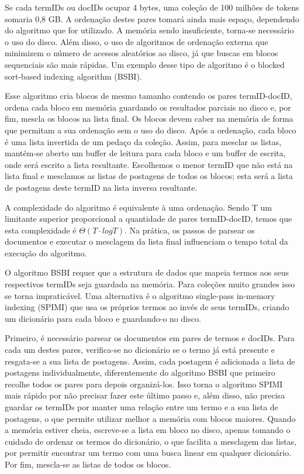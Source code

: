 Se cada termIDs ou docIDs ocupar 4 bytes, uma coleção de 100 milhões de tokens somaria 0,8 GB. A ordenação destes pares tomará ainda mais espaço, dependendo do algoritmo que for utilizado. A memória sendo insuficiente, torna-se necessário o uso do disco. Além disso, o uso de algoritmos de ordenação externa que minimizem o número de acessos aleatórios ao disco, já que buscas em blocos sequenciais são mais rápidas. Um exemplo desse tipo de algoritmo é o blocked sort-based indexing algorithm (BSBI). 

Esse algoritmo cria blocos de mesmo tamanho contendo os pares termID-docID, ordena cada bloco em memória guardando os resultados parciais no disco e, por fim, mescla os blocos na lista final. Os blocos devem caber na memória de forma que permitam a sua ordenação sem o uso do disco. Após a ordenação, cada bloco é uma lista invertida de um pedaço da coleção. Assim, para mesclar as listas, mantém-se aberto um buffer de leitura para cada bloco e um buffer de escrita, onde será escrito a lista resultante. Escolhemos o menor termID que não está na lista final e mesclamos as listas de postagens de todos os blocos; esta será a lista de postagens deste termID na lista inversa resultante. 

A complexidade do algoritmo é equivalente à uma ordenação. Sendo T um limitante superior proporcional a quantidade de pares termID-docID, temos que esta complexidade é $\Theta( T \cdot log T )$. Na prática, os passos de parsear os documentos e executar o mesclagem da lista final influenciam o tempo total da execução do algoritmo.

O algoritmo BSBI requer que a estrutura de dados que mapeia termos aos seus respectivos termIDs seja guardada na memória. Para coleções muito grandes isso se torna impraticável. Uma alternativa é o algoritmo single-pass in-memory indexing (SPIMI) que usa os próprios termos ao invés de seus termIDs, criando um dicionário para cada bloco e guardando-o no disco. 

Primeiro, é necessário parsear os documentos em pares de termos e docIDs. Para cada um destes pares, verifica-se no dicionário se o termo já está presente e resgata-se a sua lista de postagens. Assim, cada postagem é adicionada a lista de postagens individualmente, diferentemente do algoritmo BSBI que primeiro recolhe todos os pares para depois organizá-los. Isso torna o algoritmo SPIMI mais rápido por não precisar fazer este último passo e, além disso, não precisa guardar os termIDs por manter uma relação entre um termo e a sua lista de postagens, o que permite utilizar melhor a memória com blocos maiores. Quando a memória estiver cheia, escreve-se a lista em bloco no disco, apenas tomando o cuidado de ordenar os termos do dicionário, o que facilita a mesclagem das listas, por permitir encontrar um termo com uma busca linear em qualquer dicionário. Por fim, mescla-se as listas de todos os blocos. 

